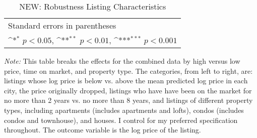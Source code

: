 	\begin{table}[htbp]\centering
		\def\sym#1{\ifmmode^{#1}\else\(^{#1}\)\fi}
		\caption{NEW: Robustness Listing Characteristics}
		\begin{tabular}{l*{3}{c}}
			\hline\hline
			
			\hline\hline
			\multicolumn{10}{l}{\footnotesize Standard errors in parentheses}\\
			\multicolumn{10}{l}{\footnotesize \sym{*} \(p<0.05\), \sym{**} \(p<0.01\), \sym{***} \(p<0.001\)}\\
		\end{tabular}
		\label{table:new_robustlisting}
		\begin{tablenotes}
			\item {\it Note:} This table breaks the effects for the combined data by high versus low price, time on market, and property type. The categories, from left to right, are: listings whose log price is below vs. above the mean predicted log price in each city, the price originally dropped, listings who have have been on the market for no more than 2 years vs. no more than 8 years, and listings of different property types, including apartments (includes apartments and lofts), condos (includes condos and townhouse), and houses. I control for my preferred specification throughout. The outcome variable is the log price of the listing.
		\end{tablenotes}
	\end{table}


